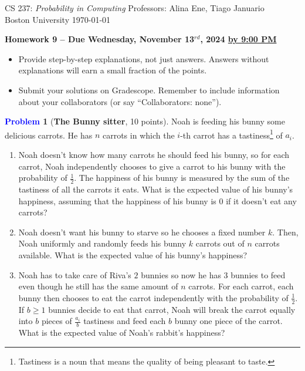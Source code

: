 \documentclass[letterpaper,11pt]{article}
\theoremstyle{plain}
\theoremstyle{definition}
\newtheorem{problem}{\textcolor{blue}{Problem}}
\theoremstyle{plain}
\begin{document}
{\noindent\large
CS 237: {\em Probability in Computing} \hfill Professors: Alina Ene, Tiago Januario\\
Boston University \hfill \today\\}
\vspace{1pt} \hrulefill\vspace{3mm}
\begin{center}
{\Large\bf Homework 9 -- Due Wednesday, November 13$^{rd}$, 2024 \underline{by 9:00 PM}}
\end{center}

\begin{itemize}
\item Provide step-by-step explanations, not just answers. Answers without explanations will earn a small fraction of the points.
\item Submit your solutions on Gradescope. Remember to include information about your collaborators (or say ``Collaborators: none'').
\end{itemize}

\begin{problem}[\textbf{The Bunny sitter}, 10 points]

Noah is feeding his bunny some delicious carrots. He has $n$ carrots in which the $i$-th carrot has a tastiness\footnote{Tastiness is a noun that means the quality of being pleasant to taste.} of $a_i$. 

\begin{enumerate}[label=(\alph*)]
\item Noah doesn't know how many carrots he should feed his bunny, so for each carrot, Noah independently chooses to give a carrot to his bunny with the probability of $\frac{1}{2}$. The happiness of his bunny is measured by the sum of the tastiness of all the carrots it eats. What is the expected value of his bunny's happiness, assuming that the happiness of his bunny is $0$ if it doesn't eat any carrots?

\item Noah doesn't want his bunny to starve so he chooses a fixed number $k$. Then, Noah uniformly and randomly feeds his bunny $k$ carrots out of $n$ carrots available. What is the expected value of his bunny's happiness?

\item Noah has to take care of Riva's $2$ bunnies so now he has $3$ bunnies to feed even though he still has the same amount of $n$ carrots.  For each carrot, each bunny then chooses to eat the carrot independently with the probability of $\frac{1}{2}$. If $b \geq 1$ bunnies decide to eat that carrot, Noah will break the carrot equally into $b$ pieces of $\frac{a_i}{b}$ tastiness and feed each $b$ bunny one piece of the carrot. What is the expected value of Noah's rabbit's happiness?
\end{enumerate}
\end{problem}
\end{document}
